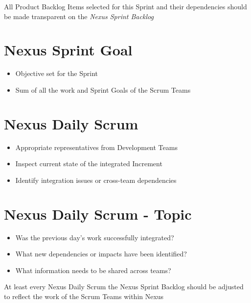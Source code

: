 \documentclass[a4paper,11pt,twocolumn]{article}
\begin{document}
\begin{tcolorbox}[colback=black!8!white,colframe=gray!50!black,title=Note,sharp corners,fonttitle=\normalsize\bfseries,fontupper=\normalsize]
	All Product Backlog Items selected for this Sprint and their dependencies should be made transparent on the \textit{Nexus Sprint Backlog}
\end{tcolorbox}

\section*{Nexus Sprint Goal}
\begin{itemize}
	\item Objective set for the Sprint
	\item Sum of all the work and Sprint Goals of the Scrum Teams
\end{itemize}

\section*{Nexus Daily Scrum}
\begin{itemize}
	\item Appropriate representatives from Development Teams
	\item Inspect current state of the integrated Increment
	\item Identify integration issues or cross-team dependencies
\end{itemize}

\section*{Nexus Daily Scrum - Topic}
\begin{itemize}
	\item Was the previous day's work successfully integrated?
	\item What new dependencies or impacts have been identified?
	\item What information needs to be shared across teams?
\end{itemize}

\begin{tcolorbox}[colback=black!8!white,colframe=gray!50!black,title=Note,sharp corners,fonttitle=\normalsize\bfseries,fontupper=\normalsize]
	At least every Nexus Daily Scrum the Nexus Sprint Backlog should be adjusted to reflect the work of the Scrum Teams within Nexus
\end{tcolorbox}
\end{document}
